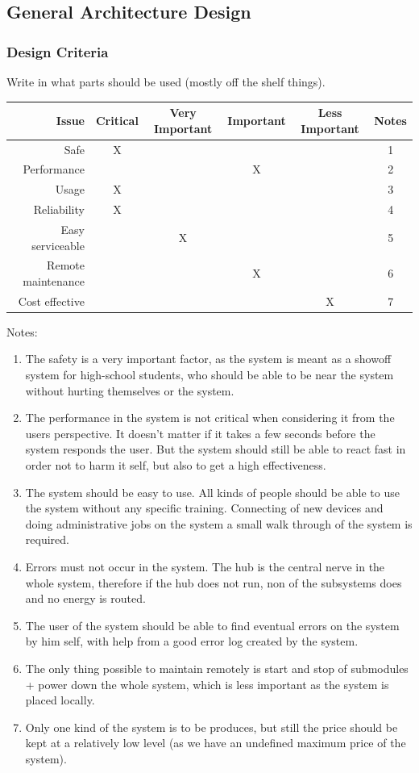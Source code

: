 \subsection{General Architecture Design}
	\subsubsection{Design Criteria}
		Write in what parts should be used (mostly off the shelf things).
				\begin{table}[h!]
					\begin{tabular}{| r | c | c | c | c | c |}
					\hline
					Issue & Critical & Very Important & Important & Less Important & Notes \\ \hline
					Safe					& X & ~ & ~ & ~ & 1 \\ \hline
					Performance 			& ~ & ~ & X & ~ & 2 \\ \hline
					Usage 				& X & ~ & ~ & ~ & 3 \\ \hline
					Reliability 			& X & ~ & ~ & ~ & 4 \\ \hline
					Easy serviceable 		& ~ & X & ~ & ~ & 5 \\ \hline
					Remote maintenance 	& ~ & ~ & X & ~ & 6 \\ \hline
					Cost effective 			& ~ & ~ & ~ & X & 7 \\ \hline
					\end{tabular}
				\end{table}
			Notes:
			\begin{enumerate}
			\item The safety is a very important factor, as the system is meant as a showoff system for high-school students, who should
			be able to be near the system without hurting themselves or the system.
			\item The performance in the system is not critical when considering it from the users perspective. It doesn't matter if it takes a few seconds before the system responds the user.
			But the system should still be able to react fast in order not to harm it self, but also to get a high effectiveness. 
			\item The system should be easy to use. All kinds of people should be able to use the system without any specific training.
			Connecting of new devices and doing administrative jobs on the system a small walk through of the system is required. 
			\item Errors must not occur in the system. The hub is the central nerve in the whole system, therefore if the hub does not run, non of the subsystems does and no energy is routed.
			\item The user of the system should be able to find eventual errors on the system by him self, with help from a good error log created by the system.
			\item The only thing possible to maintain remotely is start and stop of submodules + power down the whole system, which is less important as the system is placed locally.
			\item Only one kind of the system is to be produces, but still the price should be kept at a relatively low level (as we have an undefined maximum price of the system).
			\end{enumerate}
	\newpage
